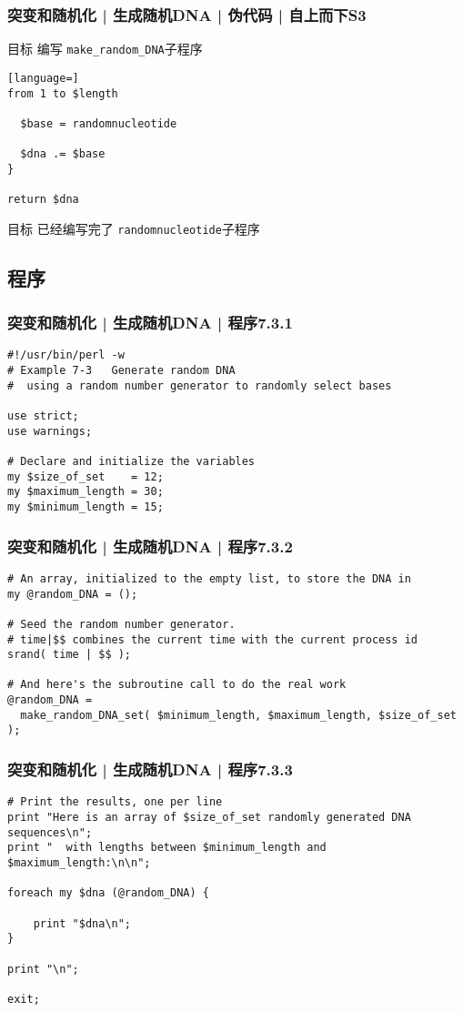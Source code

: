 \begin{frame}[fragile]
  \frametitle{突变和随机化 | 生成随机DNA | 伪代码 | 自上而下S3}
  \begin{block}{目标}
    编写 \verb|make_random_DNA|子程序
  \end{block}
  \pause
\begin{lstlisting}[language=]
from 1 to $length

  $base = randomnucleotide

  $dna .= $base
}

return $dna
\end{lstlisting}
\pause
  \begin{block}{目标}
    已经编写完了 \verb|randomnucleotide|子程序
  \end{block}
\end{frame}

\subsection{程序}
\begin{frame}[fragile]
  \frametitle{突变和随机化 | 生成随机DNA | 程序7.3.1}
\begin{lstlisting}[firstnumber=1]
#!/usr/bin/perl -w
# Example 7-3   Generate random DNA
#  using a random number generator to randomly select bases

use strict;
use warnings;

# Declare and initialize the variables
my $size_of_set    = 12;
my $maximum_length = 30;
my $minimum_length = 15;
\end{lstlisting}
\end{frame}

\begin{frame}[fragile]
  \frametitle{突变和随机化 | 生成随机DNA | 程序7.3.2}
\begin{lstlisting}[firstnumber=13]
# An array, initialized to the empty list, to store the DNA in
my @random_DNA = ();

# Seed the random number generator.
# time|$$ combines the current time with the current process id
srand( time | $$ );

# And here's the subroutine call to do the real work
@random_DNA =
  make_random_DNA_set( $minimum_length, $maximum_length, $size_of_set );
\end{lstlisting}
\end{frame}

\begin{frame}[fragile]
  \frametitle{突变和随机化 | 生成随机DNA | 程序7.3.3}
\begin{lstlisting}[firstnumber=24]
# Print the results, one per line
print "Here is an array of $size_of_set randomly generated DNA sequences\n";
print "  with lengths between $minimum_length and $maximum_length:\n\n";

foreach my $dna (@random_DNA) {

    print "$dna\n";
}

print "\n";

exit;
\end{lstlisting}
\end{frame}

